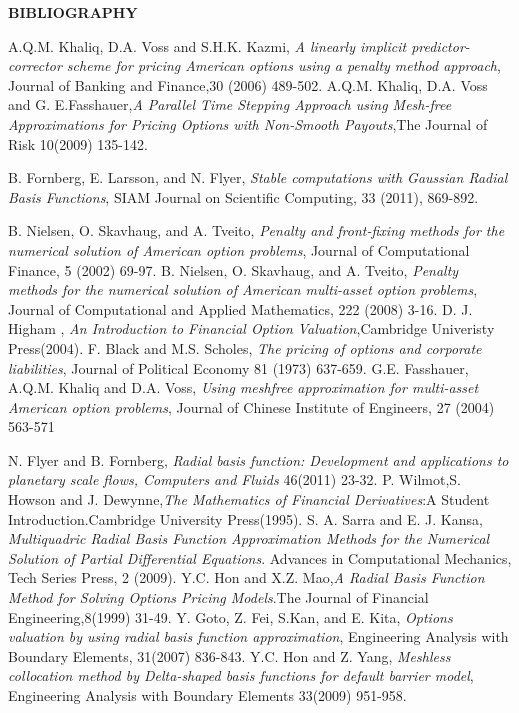 \documentclass[12pt]{article}
\numberwithin{equation}{subsection} %
\begin{document}
\newpage
\begin{center}
{\bf BIBLIOGRAPHY}
\end{center}
\begin{thebiblio}{99}



A.Q.M. Khaliq, D.A. Voss and S.H.K. Kazmi,   \emph{A linearly
implicit predictor-corrector scheme for pricing American options
using a penalty method approach}, Journal of Banking and Finance,30
(2006) 489-502.
A.Q.M. Khaliq, D.A. Voss and G. E.Fasshauer,\emph{A Parallel Time
Stepping Approach using Mesh-free Approximations for Pricing Options
with Non-Smooth Payouts},The Journal of Risk 10(2009) 135-142.

B. Fornberg, E. Larsson, and N. Flyer,\emph{ Stable computations
with Gaussian Radial Basis Functions}, SIAM Journal on Scientific
Computing, 33 (2011), 869-892.

B. Nielsen, O. Skavhaug, and A. Tveito, \emph{Penalty and
front-fixing methods for the numerical solution of American option
problems}, Journal of Computational Finance, 5 (2002) 69-97.
B. Nielsen, O. Skavhaug, and A. Tveito,\emph{ Penalty methods for
the numerical solution of American multi-asset option problems},
Journal of Computational and Applied Mathematics, 222 (2008) 3-16.
D. J. Higham , \emph{An Introduction to Financial Option
Valuation},Cambridge Univeristy Press(2004).
F. Black and M.S. Scholes, \emph{The pricing of options and
corporate liabilities}, Journal of Political Economy 81 (1973)
637-659.
G.E. Fasshauer, A.Q.M. Khaliq and D.A. Voss, \emph{Using meshfree
approximation for multi-asset American option problems}, Journal of
Chinese Institute of Engineers, 27 (2004) 563-571

N. Flyer and B. Fornberg,\emph{ Radial basis function: Development
and applications to planetary scale flows, Computers and Fluids}
46(2011) 23-32.
P. Wilmot,S. Howson and J. Dewynne,\emph{The Mathematics of
Financial Derivatives}:A Student Introduction.Cambridge University
Press(1995).
S. A. Sarra and E. J. Kansa,  \emph{Multiquadric Radial Basis
Function Approximation Methods for the Numerical Solution of Partial
Differential Equations}. Advances in Computational Mechanics, Tech
Series Press, 2 (2009).
Y.C. Hon and X.Z. Mao,\emph{A Radial Basis Function Method for
    Solving Options Pricing Models}.The Journal of Financial
    Engineering,8(1999) 31-49.
Y. Goto, Z. Fei, S.Kan, and E. Kita, \emph{Options valuation by
using radial basis function approximation}, Engineering Analysis
with Boundary Elements, 31(2007) 836-843.
Y.C. Hon and Z. Yang, \emph{Meshless collocation method by
Delta-shaped basis functions for default barrier model}, Engineering
Analysis with Boundary Elements 33(2009) 951-958.



\end{thebiblio}
\end{document}
